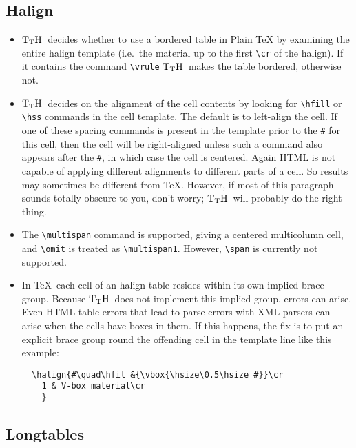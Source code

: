 \documentclass[12pt]{article}
\def\TtH{$\rm{}T_TH$}
\begin{document}
\subsection{Halign}

\begin{itemize}

\item \TtH\ decides whether to use a bordered table in Plain \TeX
 by examining the entire halign template (i.e.~the material up to the
first \verb|\cr| of the halign). If it contains the command
\verb|\vrule| \TtH\ makes the table bordered, otherwise not.


\item \TtH\ decides on the alignment of the cell contents by looking for
\verb|\hfill| or \verb|\hss| commands in the cell template. The
default is to left-align the cell. If one of these spacing commands is present
in the template prior to the \verb|#| for this cell, then the cell
will be right-aligned unless such a command also appears after the
\verb|#|, in which case the cell is centered. Again HTML is not capable of
applying different alignments to different parts of a cell. So results may
sometimes be different from \TeX. However, if most of this paragraph
sounds totally obscure to you, don't worry; \TtH\ will probably do the
right thing.

\item The \verb|\multispan| command is supported, giving a centered
multicolumn cell, and \verb|\omit| is treated as \verb|\multispan1|.
However, \verb|\span| is currently not supported.

\item In \TeX\ each cell of an halign table resides within its own
  implied brace group. Because \TtH\ does not implement this implied
  group, errors can arise. Even HTML table errors that lead to parse
  errors with XML parsers can arise when the cells have boxes in them.
  If this happens, the fix is to put an explicit brace group round the
  offending cell in the template line like this example:
\begin{verbatim}
  \halign{#\quad\hfil &{\vbox{\hsize\0.5\hsize #}}\cr
    1 & V-box material\cr
    }
\end{verbatim}

\end{itemize}


\subsection{Longtables}
\label{longtab}
\end{document}
